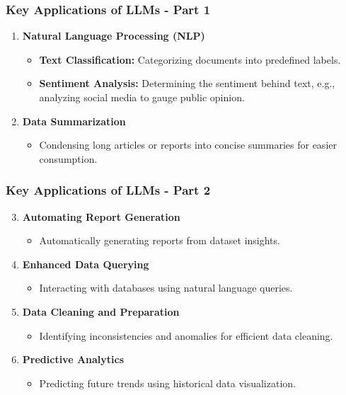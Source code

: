 \documentclass[aspectratio=169]{beamer}
\begin{document}
\begin{frame}[fragile]
    \frametitle{Key Applications of LLMs - Part 1}
    \begin{enumerate}
        \item \textbf{Natural Language Processing (NLP)}
            \begin{itemize}
                \item \textbf{Text Classification:} Categorizing documents into predefined labels.
                \item \textbf{Sentiment Analysis:} Determining the sentiment behind text, e.g., analyzing social media to gauge public opinion.
            \end{itemize}
        \item \textbf{Data Summarization}
            \begin{itemize}
                \item Condensing long articles or reports into concise summaries for easier consumption.
            \end{itemize}
    \end{enumerate}
\end{frame}

\begin{frame}[fragile]
    \frametitle{Key Applications of LLMs - Part 2}
    \begin{enumerate}
        \setcounter{enumi}{2} %
        \item \textbf{Automating Report Generation}
            \begin{itemize}
                \item Automatically generating reports from dataset insights.
            \end{itemize}
        \item \textbf{Enhanced Data Querying}
            \begin{itemize}
                \item Interacting with databases using natural language queries.
            \end{itemize}
        \item \textbf{Data Cleaning and Preparation}
            \begin{itemize}
                \item Identifying inconsistencies and anomalies for efficient data cleaning.
            \end{itemize}
        \item \textbf{Predictive Analytics}
            \begin{itemize}
                \item Predicting future trends using historical data visualization.
            \end{itemize}
    \end{enumerate}
\end{frame}
\end{document}
